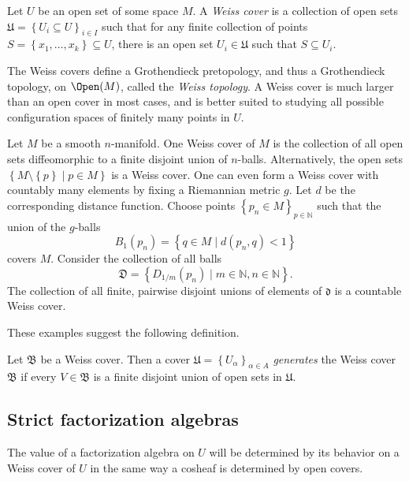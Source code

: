 \begin{definition}\label{dfn:6-1-4}
	Let $U$ be an open set of some space $M$. A \emph{Weiss cover} is a collection of open sets $\mathfrak{U} =\left\{ U_i\subseteq U \right\} _{i\in I} $ such that for any finite collection of points $S=\left\{ x_1, \ldots ,x_k \right\} \subseteq U$, there is an open set $U_i\in \mathfrak{U} $ such that $S\subseteq U_i$.
\end{definition}

The Weiss covers define a Grothendieck pretopology, and thus a Grothendieck topology, on $\Open(M) $, called the \emph{Weiss topology}. A Weiss cover is much larger than an open cover in most cases, and is better suited to studying all possible configuration spaces of finitely many points in $U$.

\begin{example}\label{ex:6-1-5}
	Let $M$ be a smooth $n$-manifold. One Weiss cover of $M$ is the collection of all open sets diffeomorphic to a finite disjoint union of $n$-balls. Alternatively, the open sets $\left\{ M\setminus \left\{ p \right\} \mid p\in M \right\} $ is a Weiss cover. One can even form a Weiss cover with countably many elements by fixing a Riemannian metric $g$. Let $d$ be the corresponding distance function. Choose points $\left\{ p_n\in M \right\} _{p\in\mathbb{N} } $ such that the union of the $g$-balls
	\[
		B_1(p_n) = \left\{ q\in M\mid d(p_n,q)<1 \right\} 
	\]
	covers $M$. Consider the collection of all balls
	\[
		\mathfrak{D} =\left\{ D_{1/m} (p_n)\mid m\in\mathbb{N} ,n\in\mathbb{N}  \right\} 
	.\]
	The collection of all finite, pairwise disjoint unions of elements of $\mathfrak{d} $ is a countable Weiss cover.
\end{example}

These examples suggest the following definition.

\begin{definition}\label{dfn:6-1-6}
	Let $\mathfrak{B} $ be a Weiss cover. Then a cover $\mathfrak{U} =\left\{ U_{\alpha }  \right\} _{\alpha \in A} $ \emph{generates} the Weiss cover $\mathfrak{B} $ if every $V\in \mathfrak{B}$ is a finite disjoint union of open sets in $\mathfrak{U} $.
\end{definition}


\subsection{Strict factorization algebras}

The value of a factorization algebra on $U$ will be determined by its behavior on a Weiss cover of $U$ in the same way a cosheaf is determined by open covers.

